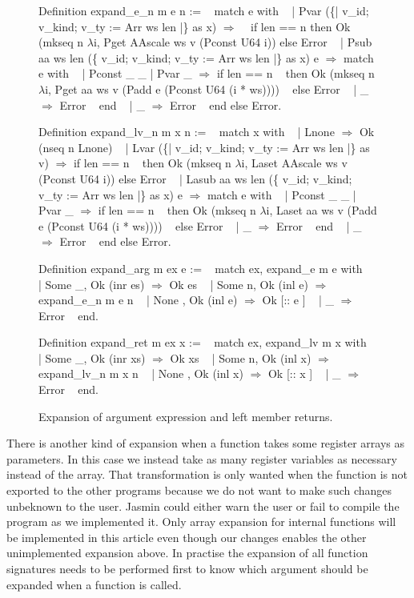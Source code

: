 \documentclass{article}
\begin{document}
\medskip

\begin{figure}[p]
\obeylines\obeyspaces\ttfamily%
Definition expand\_e\_n m e n :=
~ match e with
~ | Pvar (\{| v\_id; v\_kind; v\_ty := Arr ws len |\} as x) \(\Rightarrow\)
~   if len == n then Ok (mkseq n \(\lambda\)i, Pget AAscale ws v (Pconst U64 i)) else Error
~ | Psub aa ws len (\{ v\_id; v\_kind; v\_ty := Arr ws len |\} as x) e \(\Rightarrow\) match e with
~   | Pconst \_ \_ | Pvar \_ \(\Rightarrow\) if len == n
~     then Ok (mkseq n \(\lambda\)i, Pget aa ws v (Padd e (Pconst U64 (i * ws))))
~     else Error
~   | \_ \(\Rightarrow\) Error
~   end
~ | \_ \(\Rightarrow\) Error
~ end else Error.
 
Definition expand\_lv\_n m x n :=
~ match x with
~ | Lnone \(\Rightarrow\) Ok (nseq n Lnone)
~ | Lvar (\{| v\_id; v\_kind; v\_ty := Arr ws len |\} as v) \(\Rightarrow\) if len == n
~   then Ok (mkseq n \(\lambda\)i, Laset AAscale ws v (Pconst U64 i)) else Error
~ | Lasub aa ws len (\{ v\_id; v\_kind; v\_ty := Arr ws len |\} as x) e \(\Rightarrow\) match e with
~   | Pconst \_ \_ | Pvar \_ \(\Rightarrow\) if len == n
~     then Ok (mkseq n \(\lambda\)i, Laset aa ws v (Padd e (Pconst U64 (i * ws))))
~     else Error
~   | \_ \(\Rightarrow\) Error
~   end
~ | \_ \(\Rightarrow\) Error
~ end else Error.

Definition expand\_arg m ex e :=
~ match ex, expand\_e m e with
~ | Some \_, Ok (inr es)  \(\Rightarrow\) Ok es
~ | Some n, Ok (inl e)   \(\Rightarrow\) expand\_e\_n m e n
~ | None  , Ok (inl e)   \(\Rightarrow\) Ok [:: e ]
~ | \_                    \(\Rightarrow\) Error
~ end.

Definition expand\_ret m ex x :=
~ match ex, expand\_lv m x with
~ | Some \_, Ok (inr xs)   \(\Rightarrow\) Ok xs
~ | Some n, Ok (inl x)    \(\Rightarrow\) expand\_lv\_n m x n
~ | None  , Ok (inl x)    \(\Rightarrow\) Ok [:: x ]
~ | \_                     \(\Rightarrow\) Error
~ end.
\normalfont%
\caption{Expansion of argument expression and left member returns.}
\end{figure}

There is another kind of expansion when a function takes some register arrays as
parameters. In this case we instead take as many register variables as necessary
instead of the array. That transformation is only wanted when the function is
not exported to the other programs because we do not want to make such changes
unbeknown to the user. Jasmin could either warn the user or fail to compile the
program as we implemented it.
Only array expansion for internal functions will be implemented in this article
even though our changes enables the other unimplemented expansion above.
In practise the expansion of all function signatures needs to be performed first
to know which argument should be expanded when a function is called.
\end{document}
